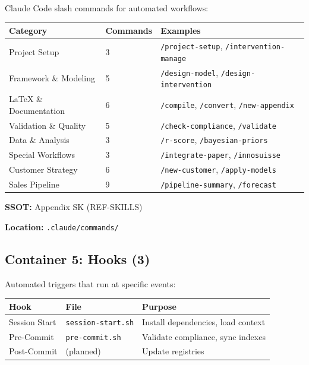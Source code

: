 Claude Code slash commands for automated workflows:

\begin{center}
\begin{tabular}{|l|l|l|}
\hline
\textbf{Category} & \textbf{Commands} & \textbf{Examples} \\
\hline
Project Setup & 3 & \texttt{/project-setup}, \texttt{/intervention-manage} \\
Framework \& Modeling & 5 & \texttt{/design-model}, \texttt{/design-intervention} \\
LaTeX \& Documentation & 6 & \texttt{/compile}, \texttt{/convert}, \texttt{/new-appendix} \\
Validation \& Quality & 5 & \texttt{/check-compliance}, \texttt{/validate} \\
Data \& Analysis & 3 & \texttt{/r-score}, \texttt{/bayesian-priors} \\
Special Workflows & 3 & \texttt{/integrate-paper}, \texttt{/innosuisse} \\
Customer Strategy & 6 & \texttt{/new-customer}, \texttt{/apply-models} \\
Sales Pipeline & 9 & \texttt{/pipeline-summary}, \texttt{/forecast} \\
\hline
\end{tabular}
\end{center}

\textbf{SSOT:} Appendix SK (REF-SKILLS)

\textbf{Location:} \texttt{.claude/commands/}


\subsection{Container 5: Hooks (3)}
\label{sec:bo-hooks}

Automated triggers that run at specific events:

\begin{center}
\begin{tabular}{|l|l|l|}
\hline
\textbf{Hook} & \textbf{File} & \textbf{Purpose} \\
\hline
Session Start & \texttt{session-start.sh} & Install dependencies, load context \\
Pre-Commit & \texttt{pre-commit.sh} & Validate compliance, sync indexes \\
Post-Commit & (planned) & Update registries \\
\hline
\end{tabular}
\end{center}

